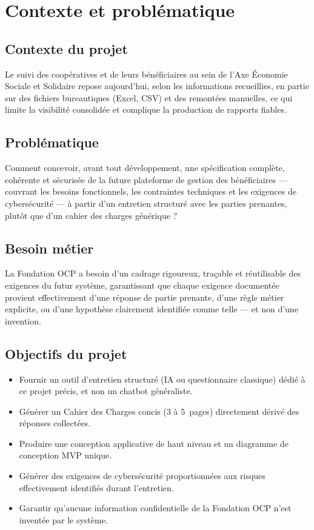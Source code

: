 \chapter{Contexte et problématique}

\section{Contexte du projet}
Le suivi des coopératives et de leurs bénéficiaires au sein de l'Axe Économie Sociale et
Solidaire repose aujourd'hui, selon les informations recueillies, en partie sur des
fichiers bureautiques (Excel, CSV) et des remontées manuelles, ce qui limite la
visibilité consolidée et complique la production de rapports fiables. 

\section{Problématique}
Comment concevoir, avant tout développement, une spécification complète, cohérente et
sécurisée de la future plateforme de gestion des bénéficiaires — couvrant les besoins
fonctionnels, les contraintes techniques et les exigences de cybersécurité — à partir
d'un entretien structuré avec les parties prenantes, plutôt que d'un cahier des charges
générique ?

\section{Besoin métier}
La Fondation OCP a besoin d'un cadrage rigoureux, traçable et réutilisable des exigences
du futur système, garantissant que chaque exigence documentée provient effectivement
d'une réponse de partie prenante, d'une règle métier explicite, ou d'une hypothèse
clairement identifiée comme telle — et non d'une invention.

\section{Objectifs du projet}
\begin{itemize}
    \item Fournir un outil d'entretien structuré (IA ou questionnaire classique) dédié à
    ce projet précis, et non un chatbot généraliste.
    \item Générer un Cahier des Charges concis (3 à 5~pages) directement dérivé des
    réponses collectées.
    \item Produire une conception applicative de haut niveau et un diagramme de
    conception MVP unique.
    \item Générer des exigences de cybersécurité proportionnées aux risques
    effectivement identifiés durant l'entretien.
    \item Garantir qu'aucune information confidentielle de la Fondation OCP n'est
    inventée par le système.
\end{itemize}

